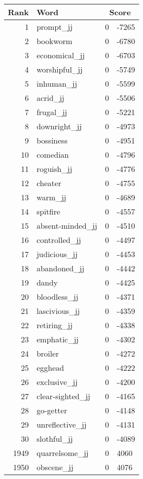 \begin{longtable}[!htbp]{| rlr@{.}l |}
    \hline
    \textbf{Rank} & \textbf{Word} & \multicolumn{2}{c|}{\textbf{Score}} \\
    \hline
    \endhead
    1 & prompt\_jj & 0 & -7265 \\
    2 & bookworm & 0 & -6780 \\
    3 & economical\_jj & 0 & -6703 \\
    4 & worshipful\_jj & 0 & -5749 \\
    5 & inhuman\_jj & 0 & -5599 \\
    6 & acrid\_jj & 0 & -5506 \\
    7 & frugal\_jj & 0 & -5221 \\
    8 & downright\_jj & 0 & -4973 \\
    9 & bossiness & 0 & -4951 \\
    10 & comedian & 0 & -4796 \\
    11 & roguish\_jj & 0 & -4776 \\
    12 & cheater & 0 & -4755 \\
    13 & warm\_jj & 0 & -4689 \\
    14 & spitfire & 0 & -4557 \\
    15 & absent-minded\_jj & 0 & -4510 \\
    16 & controlled\_jj & 0 & -4497 \\
    17 & judicious\_jj & 0 & -4453 \\
    18 & abandoned\_jj & 0 & -4442 \\
    19 & dandy & 0 & -4425 \\
    20 & bloodless\_jj & 0 & -4371 \\
    21 & lascivious\_jj & 0 & -4359 \\
    22 & retiring\_jj & 0 & -4338 \\
    23 & emphatic\_jj & 0 & -4302 \\
    24 & broiler & 0 & -4272 \\
    25 & egghead & 0 & -4222 \\
    26 & exclusive\_jj & 0 & -4200 \\
    27 & clear-sighted\_jj & 0 & -4165 \\
    28 & go-getter & 0 & -4148 \\
    29 & unreflective\_jj & 0 & -4131 \\
    30 & slothful\_jj & 0 & -4089 \\
    1949 & quarrelsome\_jj & 0 & 4060 \\
    1950 & obscene\_jj & 0 & 4076 \\

\end{longtable}
